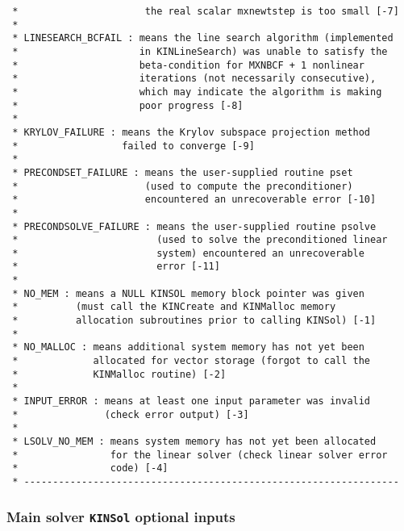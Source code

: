 \documentclass[11pt]{article}
\begin{document}
\begin{verbatim}
 *                      the real scalar mxnewtstep is too small [-7]
 *
 * LINESEARCH_BCFAIL : means the line search algorithm (implemented
 *                     in KINLineSearch) was unable to satisfy the
 *                     beta-condition for MXNBCF + 1 nonlinear
 *                     iterations (not necessarily consecutive),
 *                     which may indicate the algorithm is making
 *                     poor progress [-8]
 *
 * KRYLOV_FAILURE : means the Krylov subspace projection method
 *                  failed to converge [-9]
 *
 * PRECONDSET_FAILURE : means the user-supplied routine pset
 *                      (used to compute the preconditioner)
 *                      encountered an unrecoverable error [-10]
 *
 * PRECONDSOLVE_FAILURE : means the user-supplied routine psolve
 *                        (used to solve the preconditioned linear
 *                        system) encountered an unrecoverable
 *                        error [-11]
 *
 * NO_MEM : means a NULL KINSOL memory block pointer was given
 *          (must call the KINCreate and KINMalloc memory
 *          allocation subroutines prior to calling KINSol) [-1]
 *
 * NO_MALLOC : means additional system memory has not yet been
 *             allocated for vector storage (forgot to call the
 *             KINMalloc routine) [-2]
 *
 * INPUT_ERROR : means at least one input parameter was invalid
 *               (check error output) [-3]
 *
 * LSOLV_NO_MEM : means system memory has not yet been allocated
 *                for the linear solver (check linear solver error
 *                code) [-4]
 * -----------------------------------------------------------------

\end{verbatim}
\normalsize

\subsubsection{Main solver {\tt KINSol} optional inputs}
\end{document}
